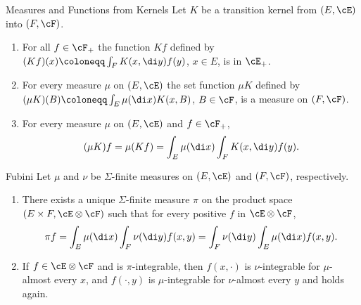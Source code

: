 \begin{thm}{Measures and Functions from Kernels}{}
	Let \(K\) be a transition kernel from \((E, \cE)\) into \((F, \cF)\).
	\begin{enumerate}
		\item For all \(f \in \cF_+\) the function \(Kf\) defined by \((Kf)(x) \coloneqq \int_F K(x, \di y) f(y)\), \(x \in E\), is in \(\cE_+\).
		\item For every measure \(\mu\) on \((E, \cE)\) the set function \(\mu K\) defined by \((\mu K)(B) \coloneqq \int_E \mu(\di x) K(x, B)\), \(B \in \cF\), is a measure on \((F, \cF)\).
		\item For every measure \(\mu\) on \((E, \cE)\) and \(f \in \cF_+\),
		      \begin{equation*}
			      (\mu K) f = \mu (K f) = \int_E \mu(\di x) \int_F K(x, \di y) f(y).
		      \end{equation*}
	\end{enumerate}
\end{thm}

\begin{thm}{Fubini}{}
	Let \(\mu\) and \(\nu\) be \(\Sigma\)-finite measures on \((E, \cE)\) and \((F, \cF)\), respectively.
	\begin{enumerate}
		\item There exists a unique \(\Sigma\)-finite measure \(\pi\) on the product space \((E \times F, \cE \otimes \cF)\) such that for every positive \(f\) in \(\cE \otimes \cF\),
		      \begin{equation}
			      \pi f = \int_E \mu(\di x) \int_F \nu(\di y) f(x, y) = \int_F \nu(\di y) \int_E \mu(\di x) f(x, y).
			      \label{eq:FubiniIntegral}
		      \end{equation}
		\item If \(f \in \cE \otimes \cF\) and is \(\pi\)-integrable, then \(f(x, \cdot)\) is \(\nu\)-integrable for \(\mu\)-almost every \(x\), and \(f(\cdot, y)\) is \(\mu\)-integrable for \(\nu\)-almost every \(y\) and  holds again.
	\end{enumerate}
\end{thm}
